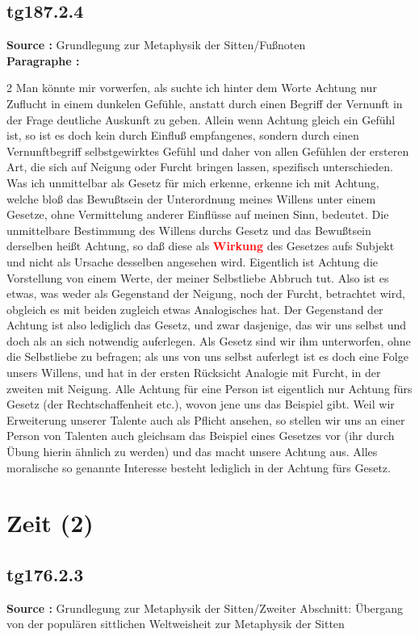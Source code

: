 \documentclass[a4paper,12pt,twoside]{book}
\newcommand{\match}[1]{\textcolor{red}{\textbf{#1}}}
\newcommand{\unnumberedsection}[1]{
	\section*{#1}
	\addcontentsline{toc}{section}{#1}
	\markright{#1}
}
\begin{document}
	\subsection*{tg187.2.4} 
	\textbf{Source : }Grundlegung zur Metaphysik der Sitten/Fußnoten\\  
	
	\noindent\textbf{Paragraphe : }
	
	2 Man könnte mir vorwerfen, als suchte ich hinter dem Worte Achtung nur Zuflucht in einem dunkelen Gefühle, anstatt durch einen Begriff der Vernunft in der Frage deutliche Auskunft zu geben. Allein wenn Achtung gleich ein Gefühl ist, so ist es doch kein durch Einfluß empfangenes, sondern durch einen Vernunftbegriff selbstgewirktes Gefühl und daher von allen Gefühlen der ersteren Art, die sich auf Neigung oder Furcht bringen lassen, spezifisch unterschieden. Was ich unmittelbar als Gesetz für mich erkenne, erkenne ich mit Achtung, welche bloß das Bewußtsein der Unterordnung meines Willens unter einem Gesetze, ohne Vermittelung anderer Einflüsse auf meinen Sinn, bedeutet. Die unmittelbare Bestimmung des Willens durchs Gesetz und das Bewußtsein derselben heißt Achtung, so daß diese als \match{Wirkung} des Gesetzes aufs Subjekt und nicht als Ursache desselben angesehen wird. Eigentlich ist Achtung die Vorstellung von 
	einem Werte, der meiner Selbstliebe Abbruch tut. Also ist es etwas, was weder als Gegenstand der Neigung, noch der Furcht, betrachtet wird, obgleich es mit beiden zugleich etwas Analogisches hat. Der Gegenstand der Achtung ist also lediglich das Gesetz, und zwar dasjenige, das wir uns selbst und doch als an sich notwendig auferlegen. Als Gesetz sind wir ihm unterworfen, ohne die Selbstliebe zu befragen; als uns von uns selbst auferlegt ist es doch eine Folge unsers Willens, und hat in der ersten Rücksicht Analogie mit Furcht, in der zweiten mit Neigung. Alle Achtung für eine Person ist eigentlich nur Achtung fürs Gesetz (der Rechtschaffenheit etc.), wovon jene uns das Beispiel gibt. Weil wir Erweiterung unserer Talente auch als Pflicht ansehen, so stellen wir uns an einer Person von Talenten auch gleichsam das Beispiel eines Gesetzes vor (ihr durch Übung hierin ähnlich zu werden) und das macht unsere Achtung aus. Alles moralische so genannte Interesse besteht lediglich in der Achtung fürs Gesetz. 
	
	\unnumberedsection{Zeit (2)} 
	\subsection*{tg176.2.3} 
	\textbf{Source : }Grundlegung zur Metaphysik der Sitten/Zweiter Abschnitt: Übergang von der populären sittlichen Weltweisheit zur Metaphysik der Sitten\\  
	
\end{document}
